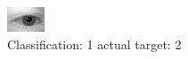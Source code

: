 \begin{figure}[h!]
\begin{center}
\includegraphics[width=0.60\columnwidth]{figures/ID350_class_1_target_2.png}
\end{center}
\caption{ Classification: 1 actual target: 2}
\label{fig:ID350_class_1_target_2}
\end{figure}
